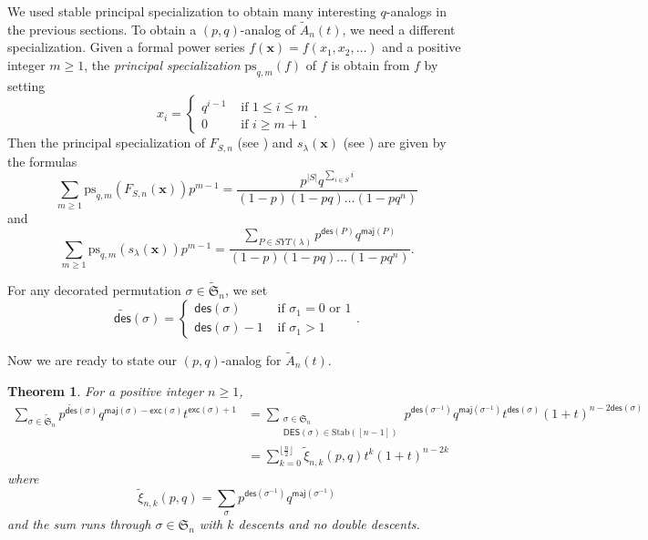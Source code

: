 \documentclass[reqno]{amsart}
\newcommand{\DES}{{\mathsf{DES}}}
\newcommand{\des}{{\mathsf{des}}}
\newcommand{\exc}{{\mathsf{exc}}}
\newcommand{\maj}{{\mathsf{maj}}}
\newcommand{\psm}{{\mathrm{ps}_{q,m}}}
\newcommand{\Stab}{{\mathrm{Stab}}}
\renewcommand{\S}{{\mathfrak{S}}}
\newcommand{\x}{{\mathbf{x}}}
\newtheorem{thm}{Theorem}[section]
\theoremstyle{definition}
\theoremstyle{remark}
\begin{document}
We used stable principal specialization to obtain many interesting $q$-analogs in the previous sections. To obtain a $(p,q)$-analog of $\widetilde{A}_n(t)$, we need a different specialization. Given a formal power series $f(\x)=f(x_1,x_2,\ldots)$ and a positive integer $m\ge 1$, the \emph{principal specialization} $\psm(f)$ of $f$ is obtain from $f$ by setting 
\[
    x_i=\begin{cases}
        q^{i-1} & \text{ if }1\le i\le m\\
        0       & \text{ if }i\ge m+1
    \end{cases}.
\]
Then the principal specialization of $F_{S,n}$ (see \cite[Lemma 5.2]{Gessel1993cycle}) and $s_{\lambda}(\x)$ (see \cite[Proposition 7.19.12]{StanleyEC2}) are given by the formulas
\begin{equation} \label{eq:psmF}
    \sum_{m\ge 1}\psm(F_{S,n}(\x))p^{m-1}=\frac{p^{|S|}q^{\sum_{i\in S}i}}{(1-p)(1-pq)\ldots(1-pq^n)}
\end{equation}
and
\begin{equation} \label{eq:psmSchur}
    \sum_{m\ge 1}\psm(s_{\lambda}(\x))p^{m-1}=\frac{\sum_{P\in SYT(\lambda)}p^{\des(P)}q^{\maj(P)}}{(1-p)(1-pq)\ldots(1-pq^n)}.
\end{equation}

For any decorated permutation $\sigma\in\widetilde{\S}_n$, we set 
\[
    \widetilde{\des}(\sigma)=\begin{cases}
        \des(\sigma) & \text{ if }\sigma_1=0 \text{ or }1\\
        \des(\sigma)-1 & \text{ if }\sigma_1>1
    \end{cases}.
\]





Now we are ready to state our $(p,q)$-analog for $\widetilde{A}_n(t)$.
\begin{thm} \label{thm:pqAnalog}
For a positive integer $n\ge 1$,
\begin{align*}
    \sum_{\sigma\in\widetilde{\S}_n}p^{\widetilde{\des}(\sigma)}q^{\maj(\sigma)-\exc(\sigma)}t^{\exc(\sigma)+1}
    &=\sum_{\substack{\sigma\in\S_n \\ \DES(\sigma)\in\Stab([n-1])}}p^{\des(\sigma^{-1})}q^{\maj(\sigma^{-1})}t^{\des(\sigma)}(1+t)^{n-2\des(\sigma)}\\
    &=\sum_{k=0}^{\lfloor\frac{n}{2}\rfloor}\widetilde{\xi}_{n,k}(p,q) t^k(1+t)^{n-2k}
\end{align*}
where 
\[
    \widetilde{\xi}_{n,k}(p,q)=\sum_{\sigma}p^{\des(\sigma^{-1})}q^{\maj(\sigma^{-1})}
\]
and the sum runs through $\sigma\in\S_n$ with $k$ descents and no double descents.
\end{thm}
\end{document}
